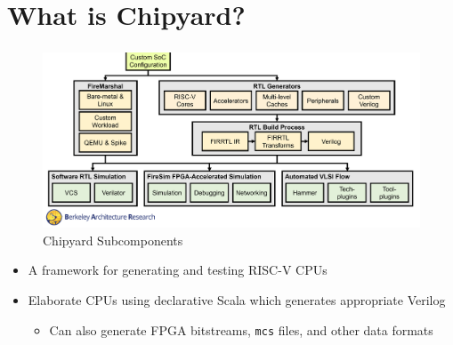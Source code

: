 \documentclass{eceday}
\begin{document}
\section{What is Chipyard?}\label{sec:What_is_Chipyard}
\begin{frame}
  \frametitle{}
  \begin{figure}[h!tbp]
    \centering
    \includegraphics[scale=0.25]{./BAR-Chipyard.png}
    \caption{Chipyard Subcomponents \parencite[p.~3]{firesimChipyardOverview}}
    \label{fig:Chipyard_Subcomponents}
  \end{figure}
  \vspace{-1.5em}
  \begin{itemize}
  \item A framework for generating and testing RISC-V CPUs
  \item Elaborate CPUs using declarative Scala which generates appropriate Verilog
    \begin{itemize}
    \item Can also generate FPGA bitstreams, \texttt{mcs} files, and other data formats
    \end{itemize}
  \end{itemize}
\end{frame}
\end{document}
